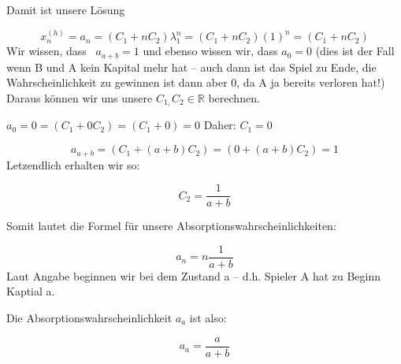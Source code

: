 \begin{uebsp}



{
Damit ist unsere L\"osung }

\begin{equation*}
x_{n}^{(h)}=a_{n}=(C_{1}+\mathit{nC}_{2})\lambda
_{1}^{n}=(C_{1}+\mathit{nC}_{2})(1)^{n}=(C_{1}+\mathit{nC}_{2})
\end{equation*}
{
Wir wissen, dass \  $a_{a+b}=1$ und ebenso wissen wir, dass  $a_{0}=0$
(dies ist der Fall wenn B und A kein Kapital mehr hat -- auch dann ist
das Spiel zu Ende, die Wahrscheinlichkeit zu gewinnen ist dann aber 0,
da A ja bereits verloren hat!) Daraus k\"onnen wir uns unsere 
$C_{1,}C_{2}\in \mathbb{R}$ berechnen.}



{
 $a_{0}=0=(C_{1}+0C_{2})=(C_{1}+0)=0$ Daher:  $C_{1}=0$ }



\begin{equation*}
a_{a+b}=(C_{1}+(a+b)C_{2})=(0+(a+b)C_{2})=1
\end{equation*}
{
Letzendlich erhalten wir so:}

\begin{equation*}
C_{2}=\frac{1}{a+b}
\end{equation*}


{
Somit lautet die Formel f\"ur unsere Absorptionswahrscheinlichkeiten:}



\begin{equation*}
a_{n}=n\frac{1}{a+b}
\end{equation*}
{
Laut Angabe beginnen wir bei dem Zustand a -- d.h. Spieler A hat zu
Beginn Kaptial a.}



{
Die Absorptionswahrscheinlichkeit  $a_{a}$ ist also:}



\begin{equation*}
a_{a}=\frac{a}{a+b}
\end{equation*}



%
\end{uebsp}

